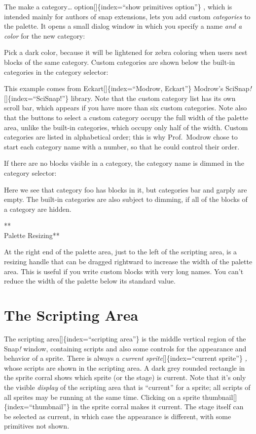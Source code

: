\documentclass[
  letterpaper,
]{book}
\begin{document}
The make a category\ldots{} option{[}{]}\{index=``show primitives
option''\} , which is intended mainly for authors of snap extensions,
lets you add custom \emph{categories} to the palette. It opens a small
dialog window in which you specify a name \emph{and a color} for the new
category:

Pick a dark color, because it will be lightened for zebra coloring when
users nest blocks of the same category. Custom categories are shown
below the built-in categories in the category selector:

This example comes from Eckart{[}{]}\{index=``Modrow, Eckart''\}
Modrow's SciSnap\emph{!}{[}{]}\{index=``SciSnap!''\} library. Note that
the custom category list has its own scroll bar, which appears if you
have more than six custom categories. Note also that the buttons to
select a custom category occupy the full width of the palette area,
unlike the built-in categories, which occupy only half of the width.
Custom categories are listed in alphabetical order; this is why
Prof.~Modrow chose to start each category name with a number, so that he
could control their order.

If there are no blocks visible in a category, the category name is
dimmed in the category selector:

Here we see that category foo has blocks in it, but categories bar and
garply are empty. The built-in categories are also subject to dimming,
if all of the blocks of a category are hidden.

**\\
Palette Resizing**

At the right end of the palette area, just to the left of the scripting
area, is a resizing handle that can be dragged rightward to increase the
width of the palette area. This is useful if you write custom blocks
with very long names. You can't reduce the width of the palette below
its standard value.

\section{The Scripting Area}\label{the-scripting-area}

The scripting area{[}{]}\{index=``scripting area''\} is the middle
vertical region of the Snap\emph{!} window, containing scripts and also
some controls for the appearance and behavior of a sprite. There is
always a \emph{current sprite}{[}{]}\{index=``current sprite''\}
\emph{,} whose scripts are shown in the scripting area. A dark grey
rounded rectangle in the sprite corral shows which sprite (or the stage)
is current. Note that it's only the visible \emph{display} of the
scripting area that is ``current'' for a sprite; all scripts of all
sprites may be running at the same time. Clicking on a sprite
thumbnail{[}{]}\{index=``thumbnail''\} in the sprite corral makes it
current. The stage itself can be selected as current, in which case the
appearance is different, with some primitives not shown.
\end{document}
